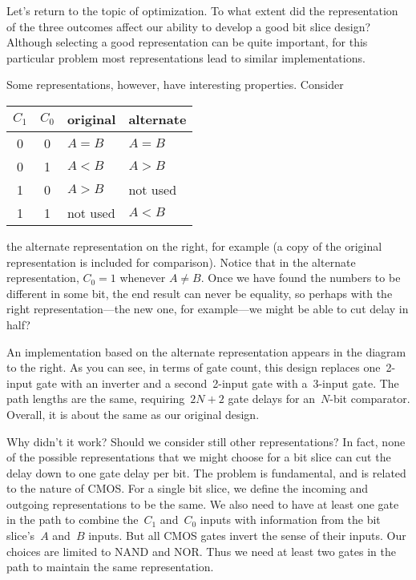 \begin{minipage}{4.21in}
Let's return to the topic of optimization.  To what extent 
did the representation of the three outcomes affect our ability
to develop a good bit slice design?  Although selecting a good 
representation can be quite important, for this particular problem
most representations lead to similar implementations.\mpline

Some representations, however, have interesting properties.  Consider\linebreak
\end{minipage}\hspace{.25in}%
\begin{minipage}{2.04in}
\begin{tabular}{cc|l|l}
$C_1$& $C_0$& original& alternate\\ \hline
0& 0& $A=B$& $A=B$\\
0& 1& $A<B$& $A>B$\\
1& 0& $A>B$& not used\\
1& 1& not used& $A<B$
\end{tabular}\vspace{12pt}
\end{minipage}\mpdone

the alternate representation on the right, for example (a copy of the 
original representation is included for comparison).  Notice that 
in the alternate representation, $C_0=1$ whenever $A\not=B$.  
%
Once we have found the numbers to be different in some bit, the end
result can never be equality, so perhaps with the right 
representation---the new one, for example---we might be able to
cut delay in half?

\begin{minipage}{2.15in}
An implementation based on the alternate representation appears in the
diagram to the right.  As you can see, in terms of gate count,
this design replaces one~\mbox{2-input} gate with an inverter and
a second~\mbox{2-input} gate with a~\mbox{3-input} gate.  The path
lengths are the same, requiring~$2N+2$ gate delays for 
an~\mbox{$N$-bit} comparator.
Overall, it is about the same as our original design.
\end{minipage}\hspace{.25in}%
\begin{minipage}{4.1in}
\end{minipage}

Why didn't it work?  Should we consider still other representations?
In fact, none of the possible representations that we might choose
for a bit slice can cut the delay down to one gate delay per bit.  
The problem is fundamental, and is related to the nature of CMOS.
For a single bit slice, we define the incoming and outgoing 
representations to be the same.  We also need to have at least
one gate in the path to combine the~$C_1$ and~$C_0$ inputs with
information from the bit slice's~$A$ and~$B$ inputs.  But all CMOS
gates invert the sense of their inputs.  Our choices are limited
to NAND and NOR.  Thus we need at least two gates in the path to
maintain the same representation.

